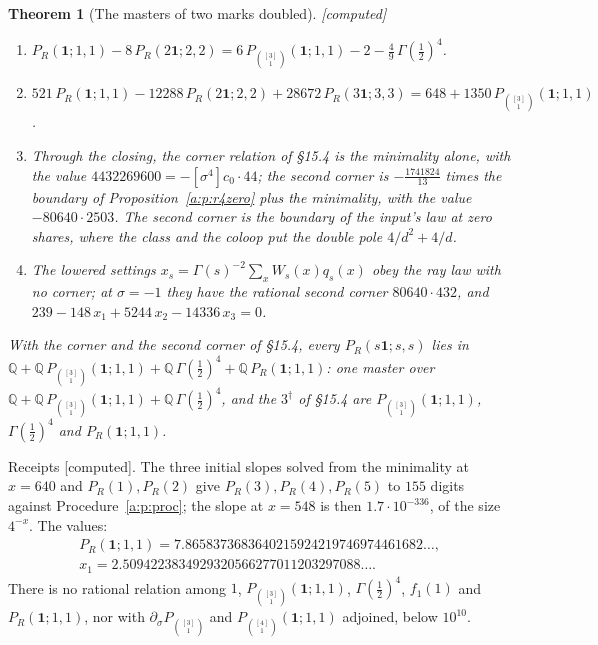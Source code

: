 \documentclass[11pt]{article}
\newcommand{\one}{\mathbf 1}
\newcommand{\Pth}{P_{\binom{[3]}1}(\one;1,1)}
\newcommand{\Pfour}{P_{\binom{[4]}1}(\one;1,1)}
\theoremstyle{plain}
\newtheorem{theorem}[proposition]{Theorem}
\theoremstyle{definition}
\theoremstyle{remark}
\newcommand{\computed}{\textup{[computed]}}
\begin{document}
\begin{theorem}[The masters of two marks doubled]\label{a:t:r4masters}\computed\
\begin{enumerate}[label=(\roman*)]
\item $P_R(\one;1,1)-8\,P_R(2\one;2,2)=6\,\Pth-2-\frac49\,\Gamma(\frac12)^4$.
\item $521\,P_R(\one;1,1)-12288\,P_R(2\one;2,2)+28672\,P_R(3\one;3,3)=648+1350\,\Pth$.
\item Through the closing, the corner relation of \S15.4 is the minimality alone, with the value $4432269600=-[\sigma^4]c_0\cdot44$; the second corner is $-\frac{1741824}{13}$ times the boundary of Proposition~\ref{a:p:r4zero} plus the minimality, with the value $-80640\cdot2503$. The second corner is the boundary of the input's law at zero shares, where the class and the coloop put the double pole $4/d^2+4/d$.
\item The lowered settings $x_s=\Gamma(s)^{-2}\sum_xW_s(x)q_s(x)$ obey the ray law with no corner; at $\sigma=-1$ they have the rational second corner $80640\cdot432$, and $239-148\,x_1+5244\,x_2-14336\,x_3=0$.
\end{enumerate}
With the corner and the second corner of \S15.4, every $P_R(s\one;s,s)$ lies in $\mathbb Q+\mathbb Q\,\Pth+\mathbb Q\,\Gamma(\frac12)^4+\mathbb Q\,P_R(\one;1,1)$: one master over $\mathbb Q+\mathbb Q\,\Pth+\mathbb Q\,\Gamma(\frac12)^4$, and the $3^\dagger$ of \S15.4 are $\Pth$, $\Gamma(\frac12)^4$ and $P_R(\one;1,1)$.
\end{theorem}

\noindent Receipts \computed. The three initial slopes solved from the minimality at $x=640$ and $P_R(1),P_R(2)$ give $P_R(3),P_R(4),P_R(5)$ to $155$ digits against Procedure~\ref{a:p:proc}; the slope at $x=548$ is then $1.7\cdot10^{-336}$, of the size $4^{-x}$. The values:
\begin{gather*}
P_R(\one;1,1)=7.8658373683640215924219746974461682\ldots,\\
x_1=2.5094223834929320566277011203297088\ldots .
\end{gather*}
There is no rational relation among $1$, $\Pth$, $\Gamma(\frac12)^4$, $f_1(1)$ and $P_R(\one;1,1)$, nor with $\partial_\sigma P_{\binom{[3]}1}$ and $\Pfour$ adjoined, below $10^{10}$.
\end{document}
